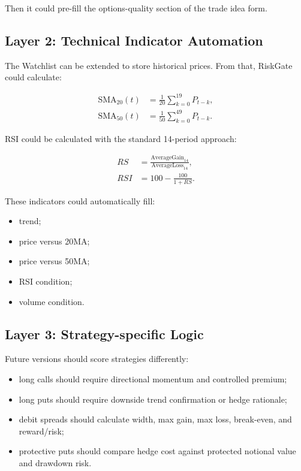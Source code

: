 \documentclass[11pt]{article}
\begin{document}
Then it could pre-fill the options-quality section of the trade idea form.

\subsection{Layer 2: Technical Indicator Automation}

The Watchlist can be extended to store historical prices. From that, RiskGate could calculate:

\begin{align}
\text{SMA}_{20}(t) &= \frac{1}{20}\sum_{k=0}^{19} P_{t-k},\\
\text{SMA}_{50}(t) &= \frac{1}{50}\sum_{k=0}^{49} P_{t-k}.
\end{align}

RSI could be calculated with the standard 14-period approach:

\begin{align}
RS &= \frac{\text{AverageGain}_{14}}{\text{AverageLoss}_{14}},\\
RSI &= 100 - \frac{100}{1 + RS}.
\end{align}

These indicators could automatically fill:

\begin{itemize}[noitemsep]
  \item trend;
  \item price versus 20MA;
  \item price versus 50MA;
  \item RSI condition;
  \item volume condition.
\end{itemize}

\subsection{Layer 3: Strategy-specific Logic}

Future versions should score strategies differently:

\begin{itemize}[noitemsep]
  \item long calls should require directional momentum and controlled premium;
  \item long puts should require downside trend confirmation or hedge rationale;
  \item debit spreads should calculate width, max gain, max loss, break-even, and reward/risk;
  \item protective puts should compare hedge cost against protected notional value and drawdown risk.
\end{itemize}
\end{document}
